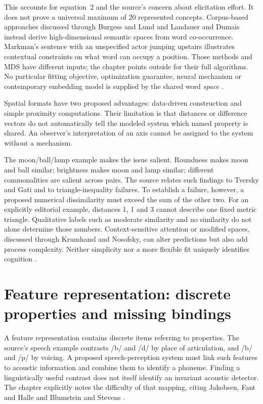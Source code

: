 This accounts for equation~2 and the source's concern about elicitation
effort. It does not prove a universal maximum of 20 represented
concepts. Corpus-based approaches discussed through Burgess and Lund
and Landauer and Dumais instead derive high-dimensional semantic
spaces from word co-occurrence. Markman's sentence with an unspecified
actor jumping upstairs illustrates contextual constraints on what
word can occupy a position. Those methods and MDS have different
inputs; the chapter points outside for their full algorithms. No
particular fitting objective, optimization guarantee, neural mechanism
or contemporary embedding model is supplied by the shared word
\emph{space} \cite[p.~41]{Markman2012CognitiveRepresentation}.

Spatial formats have two proposed advantages: data-driven construction
and simple proximity computations. Their limitation is that distances
or difference vectors do not automatically tell the modeled system
which named property is shared. An observer's interpretation of an
axis cannot be assigned to the system without a mechanism.

The moon/ball/lamp example makes the issue salient. Roundness makes
moon and ball similar; brightness makes moon and lamp similar;
different commonalities are salient across pairs. The source relates
such findings to Tversky and Gati and to triangle-inequality failures.
To establish a failure, however, a proposed numerical dissimilarity
must exceed the sum of the other two. For an explicitly editorial
example, distances 1, 1 and 3 cannot describe one fixed metric
triangle. Qualitative labels such as moderate similarity and no
similarity do not alone determine those numbers. Context-sensitive
attention or modified spaces, discussed through Krumhansl and
Nosofsky, can alter predictions but also add process complexity.
Neither simplicity nor a more flexible fit uniquely identifies cognition
\cite[pp.~41--42]{Markman2012CognitiveRepresentation}.

\section{Feature representation: discrete properties and missing bindings}
\label{sec:p19-ckr-features}

A feature representation contains discrete items referring to
properties. The source's speech example contrasts /b/ and /d/
by place of articulation, and /b/ and /p/ by voicing. A proposed
speech-perception system must link such features to acoustic
information and combine them to identify a phoneme. Finding
a linguistically useful contrast does not itself identify an
invariant acoustic detector. The chapter explicitly notes the
difficulty of that mapping, citing Jakobsen, Fant and Halle
and Blumstein and Stevens
\cite[p.~42]{Markman2012CognitiveRepresentation}.

